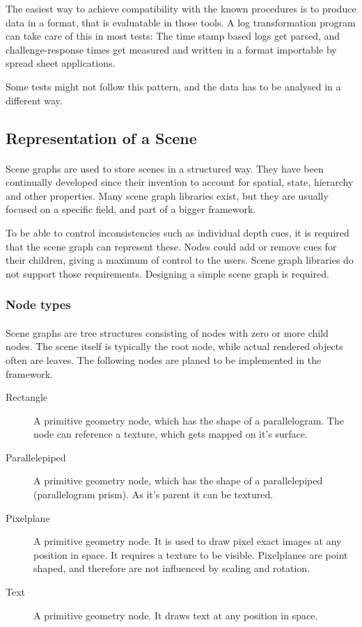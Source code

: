 The easiest way to achieve compatibility with the known procedures is to produce data in a format, that is evaluatable in those tools. A log transformation program can take care of this in most tests: The time stamp based logs get parsed, and challenge-response times get measured and written in a format importable by spread sheet applications.

Some tests might not follow this pattern, and the data has to be analysed in a different way.


\subsection{Representation of a Scene\label{sceneRep}}
\paragraph{}
Scene graphs are used to store scenes in a structured way. They have been continually developed since their invention\cite{scenegraph} to account for spatial, state, hierarchy and other properties. Many scene graph libraries exist, but they are usually focused on a specific field, and part of a bigger framework.

To be able to control inconsistencies such as individual depth cues, it is required that the scene graph can represent these. Nodes could add or remove cues for their children, giving a maximum of control to the users. Scene graph libraries do not support those requirements. Designing a simple scene graph is required.

\subsubsection{Node types}
\paragraph{}
Scene graphs are tree structures consisting of nodes with zero or more child nodes. The scene itself is typically the root node, while actual rendered objects often are leaves. The following nodes are planed to be implemented in the framework.

\begin{description}
\item[Rectangle] A primitive geometry node, which has the shape of a parallelogram. The node can reference a texture, which gets mapped on it's surface.
\item[Parallelepiped] A primitive geometry node, which has the shape of a parallelepiped (parallelogram prism). As it's parent it can be textured.
\item[Pixelplane] A primitive geometry node. It is used to draw pixel exact images at any position in space. It requires a texture to be visible. Pixelplanes are point shaped, and therefore are not influenced by scaling and rotation.
\item[Text] A primitive geometry node. It draws text at any position in space.
\end{description}

